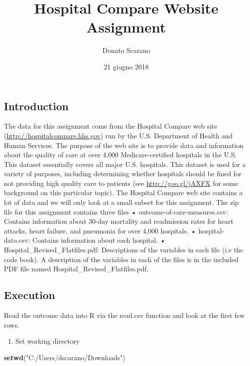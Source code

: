 \documentclass[]{article}
\title{Hospital Compare Website Assignment}
\author{Donato Scarano}
\date{21 giugno 2018}
\newenvironment{Shaded}{\begin{snugshade}}{\end{snugshade}}
\newcommand{\KeywordTok}[1]{\textcolor[rgb]{0.13,0.29,0.53}{\textbf{#1}}}
\newcommand{\StringTok}[1]{\textcolor[rgb]{0.31,0.60,0.02}{#1}}
\newcommand{\NormalTok}[1]{#1}
\providecommand{\tightlist}{%
  \setlength{\itemsep}{0pt}\setlength{\parskip}{0pt}}
\begin{document}
\maketitle

\subsection{Introduction}\label{introduction}

The data for this assignment come from the Hospital Compare web site
(\url{http://hospitalcompare.hhs.gov}) run by the U.S. Department of
Health and Human Services. The purpose of the web site is to provide
data and information about the quality of care at over 4,000
Medicare-certified hospitals in the U.S. This dataset essentially covers
all major U.S. hospitals. This dataset is used for a variety of
purposes, including determining whether hospitals should be fined for
not providing high quality care to patients (see
\url{http://goo.gl/jAXFX} for some background on this particular topic).
The Hospital Compare web site contains a lot of data and we will only
look at a small subset for this assignment. The zip file for this
assignment contains three files • outcome-of-care-measures.csv: Contains
information about 30-day mortality and readmission rates for heart
attacks, heart failure, and pneumonia for over 4,000 hospitals. •
hospital-data.csv: Contains information about each hospital. •
Hospital\_Revised\_Flatfiles.pdf: Descriptions of the variables in each
file (i.e the code book). A description of the variables in each of the
files is in the included PDF file named
Hospital\_Revised\_Flatfiles.pdf.

\subsection{Execution}\label{execution}

Read the outcome data into R via the read.csv function and look at the
first few rows.

\begin{enumerate}
\def\labelenumi{\arabic{enumi}.}
\tightlist
\item
  Set working directory
\end{enumerate}

\begin{Shaded}
\begin{Highlighting}[]
\KeywordTok{setwd}\NormalTok{(}\StringTok{"C:/Users/dscarano/Downloads"}\NormalTok{)}
\end{Highlighting}
\end{Shaded}
\end{document}
